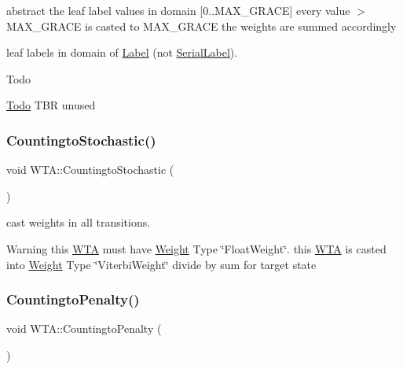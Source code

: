abstract the leaf label values in domain \mbox{[}0..M\+A\+X\+\_\+\+G\+R\+A\+CE\mbox{]} every value $>$ M\+A\+X\+\_\+\+G\+R\+A\+CE is casted to M\+A\+X\+\_\+\+G\+R\+A\+CE the weights are summed accordingly 

leaf labels in domain of \mbox{\hyperlink{classLabel}{Label}} (not \mbox{\hyperlink{classSerialLabel}{Serial\+Label}}). \begin{DoxyRefDesc}{Todo}
\item[\mbox{\hyperlink{todo__todo000020}{Todo}}]T\+BR unused \end{DoxyRefDesc}
\mbox{\label{group__schemata_ga8dfef6b591f952f0fea9dae1f5e475c7}} 
\subsubsection{\texorpdfstring{CountingtoStochastic()}{CountingtoStochastic()}}
{\footnotesize\ttfamily void W\+T\+A\+::\+Countingto\+Stochastic (\begin{DoxyParamCaption}{ }\end{DoxyParamCaption})}



cast weights in all transitions. 

\begin{DoxyWarning}{Warning}
this \mbox{\hyperlink{classWTA}{W\+TA}} must have \mbox{\hyperlink{classWeight}{Weight}} Type \char`\"{}\+Float\+Weight\char`\"{}. this \mbox{\hyperlink{classWTA}{W\+TA}} is casted into \mbox{\hyperlink{classWeight}{Weight}} Type \char`\"{}\+Viterbi\+Weight\char`\"{} divide by sum for target state 
\end{DoxyWarning}
\mbox{\label{group__schemata_ga5f3a0d868bf26b504cccc53b4d55e09a}} 
\subsubsection{\texorpdfstring{CountingtoPenalty()}{CountingtoPenalty()}}
{\footnotesize\ttfamily void W\+T\+A\+::\+Countingto\+Penalty (\begin{DoxyParamCaption}{ }\end{DoxyParamCaption})}




